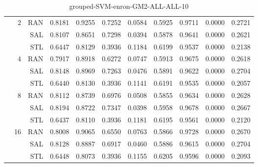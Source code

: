 \begin{center}
\begin{table}[htbp]
\begin{center}
\begin{tabular}{ | r | r | r | r | r | r | r | r | r | r | r |}
 & \multirow{3}{*}{2} & RAN & 0.8181 & 0.9255 & 0.7252 & 0.0584 & 0.5925 & 0.9711 & 0.0000 & 0.2721\\ \cline{3-11}
 &   & SAL & 0.8107 & 0.8651 & 0.7298 & 0.0394 & 0.5878 & 0.9641 & 0.0000 & 0.2621\\ \cline{3-11}
 &   & STL & 0.6447 & 0.8129 & 0.3936 & 0.1184 & 0.6199 & 0.9537 & 0.0000 & 0.2138\\ \cline{2-11}
 & \multirow{3}{*}{4} & RAN & 0.7917 & 0.8918 & 0.6272 & 0.0747 & 0.5913 & 0.9675 & 0.0000 & 0.2618\\ \cline{3-11}
 &   & SAL & 0.8148 & 0.8969 & 0.7263 & 0.0476 & 0.5891 & 0.9622 & 0.0000 & 0.2704\\ \cline{3-11}
 &   & STL & 0.6440 & 0.8130 & 0.3936 & 0.1141 & 0.6191 & 0.9535 & 0.0000 & 0.2057\\ \cline{2-11}
 & \multirow{3}{*}{8} & RAN & 0.8112 & 0.8739 & 0.6976 & 0.0508 & 0.5855 & 0.9634 & 0.0000 & 0.2628\\ \cline{3-11}
 &   & SAL & 0.8194 & 0.8722 & 0.7347 & 0.0398 & 0.5958 & 0.9678 & 0.0000 & 0.2667\\ \cline{3-11}
 &   & STL & 0.6437 & 0.8110 & 0.3936 & 0.1181 & 0.6195 & 0.9561 & 0.0000 & 0.2120\\ \cline{2-11}
 & \multirow{3}{*}{16} & RAN & 0.8008 & 0.9065 & 0.6550 & 0.0763 & 0.5866 & 0.9728 & 0.0000 & 0.2670\\ \cline{3-11}
 &   & SAL & 0.8128 & 0.8887 & 0.6917 & 0.0460 & 0.5886 & 0.9615 & 0.0000 & 0.2704\\ \cline{3-11}
 &   & STL & 0.6448 & 0.8073 & 0.3936 & 0.1155 & 0.6205 & 0.9596 & 0.0000 & 0.2093\\ \cline{2-11}
\hline
\end{tabular}
\caption{grouped-SVM-enron-GM2-ALL-ALL-10}
\end{center}
 \end{table}
\end{center}

